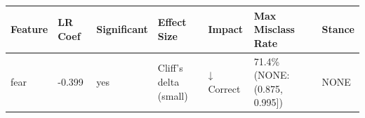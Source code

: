 \begin{tabular}{lllllll}
\toprule
Feature & LR Coef & Significant & Effect Size & Impact & Max Misclass Rate & Stance \\
\midrule
fear & -0.399 & yes & Cliff's delta (small) & ↓ Correct & 71.4\% (NONE: (0.875, 0.995]) & NONE \\
\bottomrule
\end{tabular}
